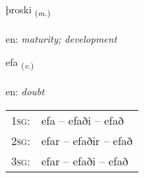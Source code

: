 \documentclass[frontgrid, backgrid]{flacards}\usepackage[]{graphicx}\usepackage[]{color}
\begin{document}
\renewcommand{\flhead}{\vskip5pt \fboxsep=0pt {\small\bfseries\footnotesize Nafnorð | Noun}}
\renewcommand{\fcfoot}{\vskip5pt \fboxsep=0pt \hspace{2pt}{\small\bfseries\footnotesize 2K}}

\renewcommand{\blhead}{\vskip5pt {\small\bfseries\footnotesize Nafnorð | Noun }}
\renewcommand{\bcfoot}{\vskip5pt \hspace{2pt}{\small\bfseries\footnotesize 2K}}


{þroski \small{\textsubscript{(\textit{m.})}} \\[1ex] %
\textphonetic{[θrɔscɪ]} \\
en: \emph{maturity; development} \\  [2ex]
\renewcommand*{\arraystretch}{0.8}
}

\renewcommand{\flhead}{\vskip5pt \fboxsep=0pt {\small\bfseries\footnotesize Sagnorð | Verb}}
\renewcommand{\fcfoot}{\vskip5pt \fboxsep=0pt \hspace{2pt}{\small\bfseries\footnotesize 2K}}

\renewcommand{\blhead}{\vskip5pt {\small\bfseries\footnotesize Sagnorð | Verb }}
\renewcommand{\bcfoot}{\vskip5pt \hspace{2pt}{\small\bfseries\footnotesize 2K}}


{efa \small{\textsubscript{(\textit{v.})}} \\[1ex] %
\textphonetic{[ɛːva]} \\
en: \emph{doubt} \\  [2ex]
\renewcommand*{\arraystretch}{0.8}
\begin{tabular}{p{1cm}l}
\textsc{1sg}: & efa -- efaði -- efað \\ 
\textsc{2sg}: & efar -- efaðir -- efað \\ 
\textsc{3sg}: & efar -- efaði -- efað \\ 
\end{tabular}
}
\end{document}
